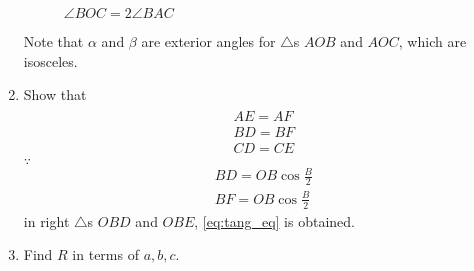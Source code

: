 \begin{enumerate}[label=\arabic*.,ref=\thesubsection.\theenumi]
\begin{figure}[!ht]
	\begin{center}
		
		\resizebox{\columnwidth}{!}{}
	\end{center}
	\caption{$\angle BOC = 2\angle BAC$}
	\label{ch3_perp_bisector_circ}	
\end{figure}
%
\solution Note that $\alpha$ and $\beta $ are exterior angles for $\triangle$s $AOB$ and $AOC$, which are isosceles.
%
\item Show that 
\begin{align}
\label{eq:tang_eq}
\begin{split}
AE=AF
\\
BD = BF
\\
CD = CE
\end{split}
\end{align}
%
\solution $\because$
\begin{align}
BD = OB \cos \frac{B}{2}
\\
BF = OB \cos \frac{B}{2}
\end{align}
in right $\triangle$s $OBD$ and $OBE$, \eqref{eq:tang_eq} is obtained.

\item Find $R$ in terms of $a, b, c$.
\end{enumerate}

